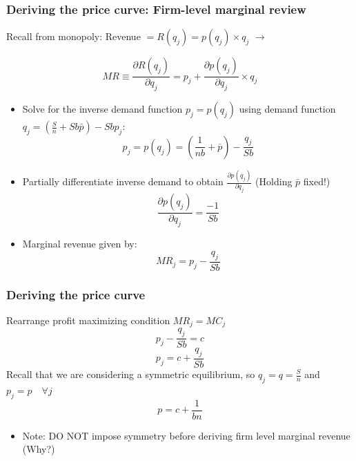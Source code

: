 \documentclass{beamer}
\begin{document}
\begin{frame}
\frametitle{Deriving the price curve: Firm-level marginal review}
\footnotesize	

Recall from monopoly: Revenue $=R(q_j)=p(q_j)\times q_j$ $\rightarrow$

\begin{equation}
MR\equiv \frac{\partial R(q_j)}{\partial q_j}=p_j + \frac{\partial p(q_j)}{\partial q_j}\times q_j \nonumber
\end{equation}
\begin{itemize}
	\footnotesize
	\item Solve for the inverse demand function $p_j=p(q_j)$ using demand function $q_j=\left(\frac{S}{n} +Sb\bar{p} \right) -Sbp_j$:
	\begin{equation}
	p_j=p(q_j)=\left(\frac{1}{nb} + \bar{p} \right) -\frac{q_j}{Sb} \nonumber
	\end{equation}
	\item Partially differentiate inverse demand to obtain $\frac{\partial p(q_j)}{\partial q_j}$ (Holding $\bar{p}$ fixed!)
	\begin{equation}
	\frac{\partial p(q_j)}{\partial q_j}= \frac{-1}{Sb} \nonumber
	\end{equation}
	\item Marginal revenue given by:
	\begin{equation}
	MR_j=p_j-\frac{q_j}{Sb} \nonumber
	\end{equation}
\end{itemize}
\end{frame}

\begin{frame}
	\frametitle{Deriving the price curve}

Rearrange profit maximizing condition  $MR_j=MC_j$
\begin{equation}
p_j-\frac{q_j}{Sb}=c \nonumber
\end{equation} 
\begin{equation}
p_j=c + \frac{q_j}{Sb} \nonumber
\end{equation} 
Recall that we are considering a symmetric equilibrium, so $q_j=q=\frac{S}{n}$ and $p_j = p \quad \forall j$
\begin{equation}
p=c + \frac{1}{bn} \nonumber
\end{equation} 
	\begin{itemize}
		\item Note: DO NOT impose symmetry before deriving firm level marginal revenue (Why?)
	\end{itemize}
	


\end{frame}
\end{document}
